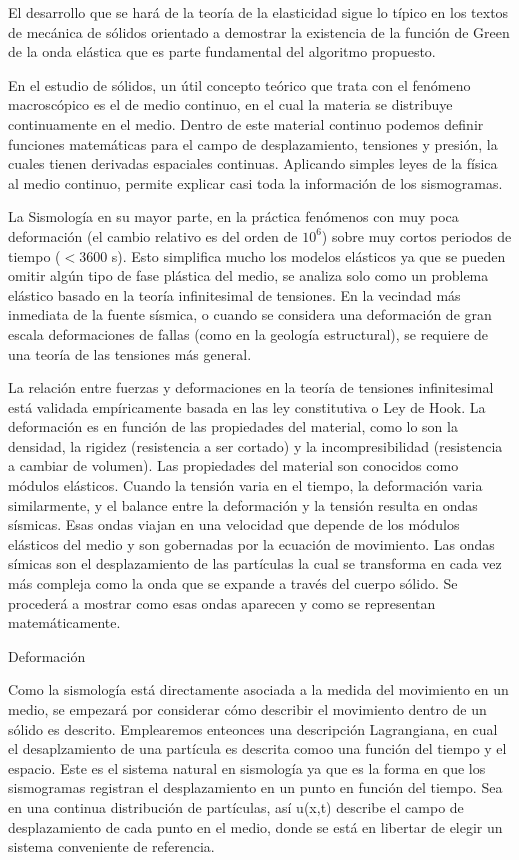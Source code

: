 El desarrollo que se hará de la teoría de la elasticidad sigue lo típico en los
textos de mecánica de sólidos orientado a demostrar la existencia de la función
de Green de la onda elástica que es parte fundamental del algoritmo propuesto.

En el estudio de sólidos, un útil concepto teórico que trata con el fenómeno
macroscópico es el de medio continuo, en el cual la materia se distribuye
continuamente en el medio. Dentro de este material continuo podemos definir
funciones matemáticas para el campo de desplazamiento, tensiones y presión, la
cuales tienen derivadas espaciales continuas. Aplicando simples leyes de la
física al medio continuo, permite explicar casi toda la información de los
sismogramas.

La Sismología en su mayor parte, en la práctica fenómenos con muy poca
deformación (el cambio relativo es del orden de $10^6$) sobre muy cortos
periodos de tiempo ($<3600$ s). Esto simplifica mucho los modelos elásticos ya
que se pueden omitir algún tipo de fase plástica del medio, se analiza solo como
un problema elástico basado en la teoría infinitesimal de tensiones. En la
vecindad más inmediata de la fuente sísmica, o cuando se considera una
deformación de gran escala deformaciones de fallas (como en la geología
estructural), se requiere de una teoría de las tensiones más general.

La relación entre fuerzas y deformaciones en la teoría de tensiones
infinitesimal está validada empíricamente basada en las ley constitutiva o Ley
de Hook. La deformación es en función de las propiedades del material, como lo
son la densidad, la rigidez (resistencia a ser cortado) y la incompresibilidad
(resistencia a cambiar de volumen). Las propiedades del material son conocidos
como módulos elásticos. Cuando la tensión varia en el tiempo, la deformación
varia similarmente, y el balance entre la deformación y la tensión resulta en
ondas sísmicas. Esas ondas viajan en una velocidad que depende de los módulos
elásticos del medio y son gobernadas por la ecuación de movimiento. Las ondas
símicas son el desplazamiento de las partículas la cual se transforma en cada
vez más compleja como la onda que se expande a través del cuerpo sólido. Se
procederá a mostrar como esas ondas aparecen y como se representan
matemáticamente.


Deformación

Como la sismología está directamente asociada a la medida del movimiento en un
medio, se empezará por considerar cómo describir el movimiento dentro de un
sólido es descrito. Emplearemos enteonces una descripción Lagrangiana, en cual
el desaplzamiento de una partícula es descrita comoo una función del tiempo y el
espacio. Este es el sistema natural en sismología ya que es la forma en que los
sismogramas registran el desplazamiento en un punto en función del tiempo. Sea
en una continua distribución de partículas, así u(x,t) describe el campo de
desplazamiento de cada punto en el medio, donde se está en libertar de elegir un
sistema conveniente de referencia.

